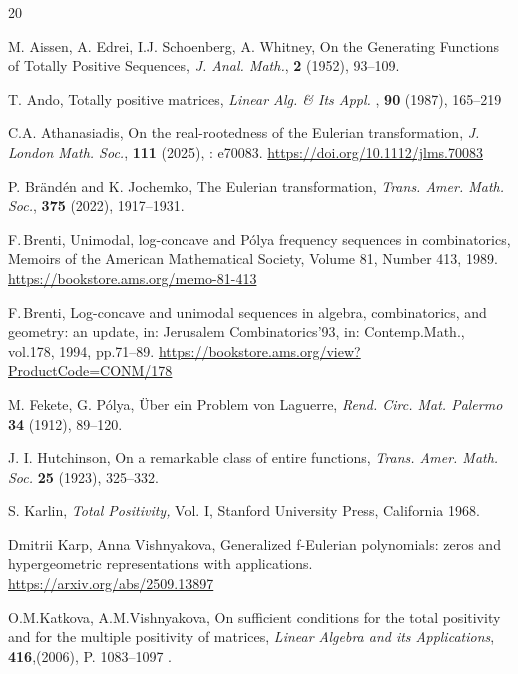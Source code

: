 \documentclass[12pt]{amsart}
\numberwithin{count}{section}
\begin{document}
\begin{thebibliography}{20}

M. Aissen, A. Edrei, I.J. Schoenberg, A. Whitney, On the
Generating Functions of Totally Positive Sequences, \textsl{ J.
Anal. Math.}, \textbf{2} (1952), 93--109.

T. Ando, Totally positive matrices,  \textsl{ Linear Alg. \& Its Appl.} , \textbf{90} 
(1987),  165--219

C.A. Athanasiadis,  On the real-rootedness of the Eulerian transformation, \textsl{J. London Math. 
Soc.}, \textbf{111} (2025), : e70083. \url{https://doi.org/10.1112/jlms.70083}

P. Br\"and\'en and K. Jochemko, The Eulerian transformation,  \textsl{ Trans. Amer. Math. 
Soc.},  \textbf{375} (2022), 1917--1931.

 F.\,Brenti, Unimodal, log-concave and P\'{o}lya frequency 
sequences in combinatorics, Memoirs of the American Mathematical Society,  Volume 81, 
Number 413, 1989. \url{https://bookstore.ams.org/memo-81-413}
		
 F.\,Brenti, Log-concave and unimodal sequences in algebra, 
combinatorics, and geometry: an update, in: Jerusalem Combinatorics’93, in: Contemp.Math., 
vol.178, 1994, pp.71--89.
\url{https://bookstore.ams.org/view?ProductCode=CONM/178}


M. Fekete, G. P\'olya, \"Uber ein Problem von Laguerre, \textsl{
Rend. Circ. Mat. Palermo} \textbf{34} (1912), 89--120.


J. I. Hutchinson,  On a remarkable class of entire functions,
\textsl{Trans. Amer. Math. Soc.} \textbf{25} (1923), 325--332.

S. Karlin,  \textsl{Total Positivity,} Vol. I, Stanford University
Press, California 1968.

Dmitrii Karp, Anna Vishnyakova, Generalized f-Eulerian polynomials: zeros 
and hypergeometric representations with applications. 
\url{https://arxiv.org/abs/2509.13897}

O.M.Katkova, A.M.Vishnyakova, On sufficient conditions for the
total positivity and for the multiple positivity of matrices,
\textsl{ Linear Algebra and its Applications},
\textbf{416},(2006), P. 1083--1097 .


\end{thebibliography}
\end{document}
